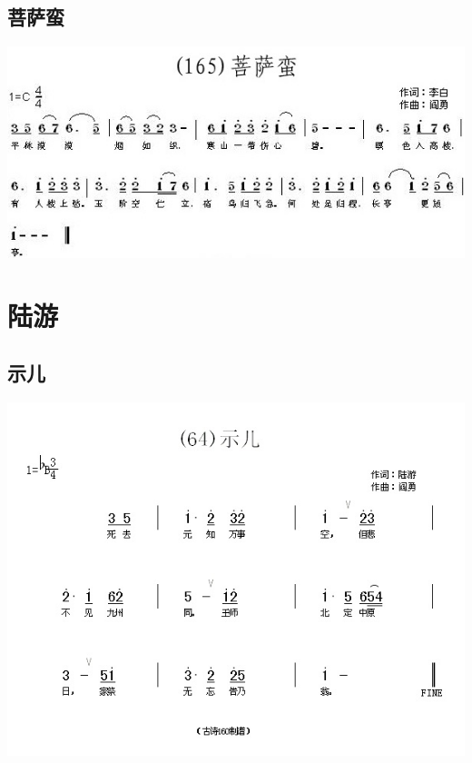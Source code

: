 \documentclass[cn,pad,twocol]{elegantbook}
\begin{document}
\section{菩萨蛮}
    \includegraphics[width=\textwidth]{dongxiao/20200808-菩萨蛮-李白.jpg}
      
\chapter{陆游}
\section{示儿}
    \includegraphics[width=\textwidth]{dongxiao/20200808-示儿-陆游.jpg} 
\end{document}
